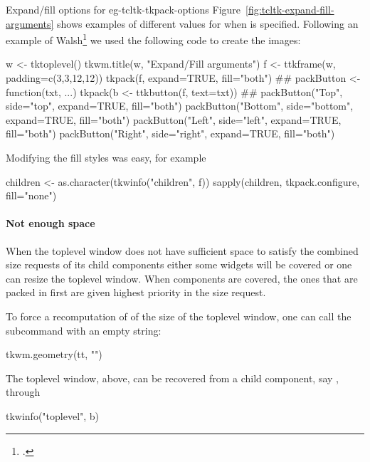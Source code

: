 \begin{example}{Expand/fill options for }{eg-tcltk-tkpack-options}
Figure~\ref{fig:tcltk-expand-fill-arguments} shows examples of
different values for  when  is
specified. Following an example of Walsh\footcite{Walsh} we used the following code to create the
images:
\begin{Schunk}
\begin{Sinput}
 w <- tktoplevel()
 tkwm.title(w, "Expand/Fill arguments")
 f <- ttkframe(w, padding=c(3,3,12,12))
 tkpack(f, expand=TRUE, fill="both")
 ##
 packButton <- function(txt, ...) 
   tkpack(b <- ttkbutton(f, text=txt))
 ##
 packButton("Top",    side="top",    expand=TRUE, fill="both") 
 packButton("Bottom", side="bottom", expand=TRUE, fill="both") 
 packButton("Left",   side="left",   expand=TRUE, fill="both") 
 packButton("Right",  side="right",  expand=TRUE, fill="both") 
\end{Sinput}
\end{Schunk}
%

Modifying the fill styles was easy, for example
\begin{Schunk}
\begin{Sinput}
 children <- as.character(tkwinfo("children", f))
 sapply(children, tkpack.configure, fill="none")
\end{Sinput}
\end{Schunk}
\end{example}



\paragraph{Not enough space}
When the toplevel window does not have sufficient space to satisfy the
combined size requests of its child components either some
widgets will be covered or one can resize the toplevel window.
When components are covered, the ones that are packed in first are given
highest priority in the size request.

To force a recomputation of of the size of the toplevel window, one can
call the  subcommand with an empty string:
\begin{Schunk}
\begin{Sinput}
 tkwm.geometry(tt, "")
\end{Sinput}
\end{Schunk}
%
The toplevel window,  above, can be recovered from a child
component, say , through
\begin{Schunk}
\begin{Sinput}
 tkwinfo("toplevel", b)
\end{Sinput}
\end{Schunk}


